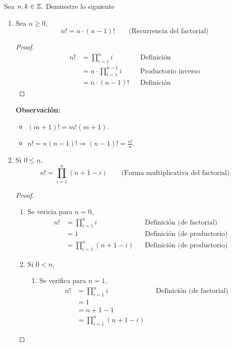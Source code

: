 Sea $n,k\in \mathbb{Z}$. Demuestre lo siguiente
\begin{enumerate}[label=\alph*)]
  \item Sea $n\geq 0$, \[n! = n\cdot (n-1)! \qquad \text{(Recurrencia del factorial)}\]
  \begin{proof}\leavevmode
    \begin{align*}
      n! &= \prod_{i=1}^{n} i && \text{Definición}\\
      &= n\cdot \prod_{i=1}^{n-1} i && \text{Productorio inverso}\\
      &= n\cdot (n-1)! && \text{Definición}
    \end{align*}
  \end{proof}
  \textbf{Observación:}
  \vspace{-1em}\begin{itemize}
    \item $(m+1)! = m!(m+1)$.
    \item $n! = n(n-1)! \Rightarrow (n-1)! = \frac{n!}{n}$.
  \end{itemize}\vspace{-1em}
  
  \item Si $0\leq n$, \[n! = \prod_{i=1}^n (n+1-i) \qquad \text{(Forma multiplicativa del factorial)}\]
  
  \begin{proof}\leavevmode
    \begin{enumerate}[label=\Roman*)]
      \item Se vericia para $n=0$,
      \begin{align*}
        n! &= \prod_{i=1}^n i && \text{Definición (de factorial)}\\
        &= 1 && \text{Definición (de productorio)}\\
        &= \prod_{i=1}^n (n+1-i) && \text{Definición (de productorio)}
      \end{align*}
      
      \item Si $0<n$,
      \begin{enumerate}[label=\roman*)]
        \item Se verifica para $n=1$,
        \begin{align*}
          n! &= \prod_{i=1}^n i && \text{Definición (de factorial)}\\
          &= 1 \\
          &= n + 1 - 1 \\
          &= \prod_{i=1}^n (n+1-i)
        \end{align*}
        

\end{enumerate}
\end{enumerate}
\end{proof}
\end{enumerate}
